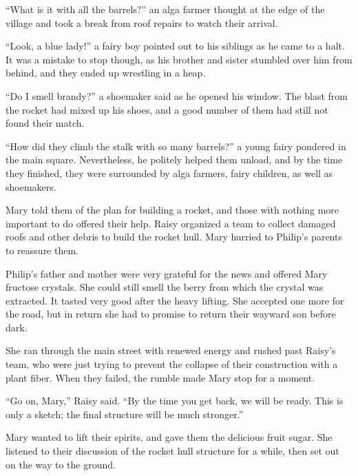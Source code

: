 \documentclass[10pt, draft]{memoir}
\begin{document}
``What is it with all the barrels?'' an alga farmer thought at the edge of the village and took a break from roof repairs to watch their arrival.

``Look, a blue lady!'' a fairy boy pointed out to his siblings as he came to a halt. It was a mistake to stop though, as his brother and sister stumbled over him from behind, and they ended up wrestling in a heap.

``Do I smell brandy?'' a shoemaker said as he opened his window. The blast from the rocket had mixed up his shoes, and a good number of them had still not found their match.

``How did they climb the stalk with so many barrels?'' a young fairy pondered in the main square. Nevertheless, he politely helped them unload, and by the time they finished, they were surrounded by alga farmers, fairy children, as well as shoemakers.

Mary told them of the plan for building a rocket, and those with nothing more important to do offered their help. Raisy organized a team to collect damaged roofs and other debris to build the rocket hull. Mary hurried to Philip's parents to reassure them.

Philip's father and mother were very grateful for the news and offered Mary fructose crystals. She could still smell the berry from which the crystal was extracted. It tasted very good after the heavy lifting. She accepted one more for the road, but in return she had to promise to return their wayward son before dark.

She ran through the main street with renewed energy and rushed past Raisy's team, who were just trying to prevent the collapse of their construction with a plant fiber. When they failed, the rumble made Mary stop for a moment.

``Go on, Mary,'' Raisy said. ``By the time you get back, we will be ready. This is only a sketch; the final structure will be much stronger.''

Mary wanted to lift their spirits, and gave them the delicious fruit sugar. She listened to their discussion of the rocket hull structure for a while, then set out on the way to the ground.
\end{document}
